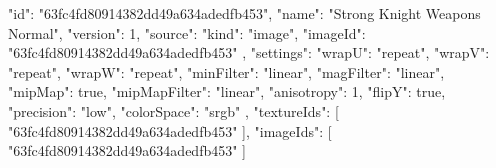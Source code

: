{
  "id": "63fc4fd80914382dd49a634adedfb453",
  "name": "Strong Knight Weapons Normal",
  "version": 1,
  "source": {
    "kind": "image",
    "imageId": "63fc4fd80914382dd49a634adedfb453"
  },
  "settings": {
    "wrapU": "repeat",
    "wrapV": "repeat",
    "wrapW": "repeat",
    "minFilter": "linear",
    "magFilter": "linear",
    "mipMap": true,
    "mipMapFilter": "linear",
    "anisotropy": 1,
    "flipY": true,
    "precision": "low",
    "colorSpace": "srgb"
  },
  "textureIds": [
    "63fc4fd80914382dd49a634adedfb453"
  ],
  "imageIds": [
    "63fc4fd80914382dd49a634adedfb453"
  ]
}
